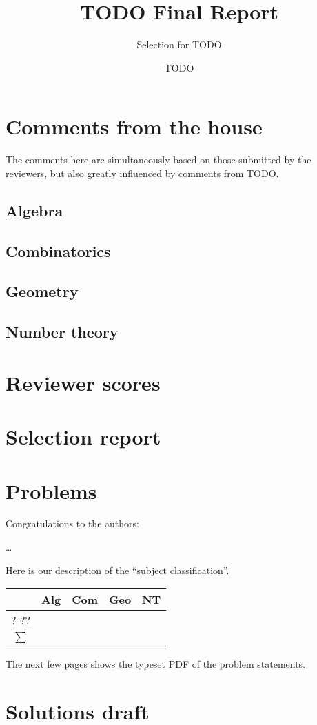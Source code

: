 \documentclass[11pt]{scrreprt}
\begin{document}
\title{TODO Final Report}
\subtitle{Selection for TODO}
\author{TODO}
\maketitle

\tableofcontents

\chapter{Comments from the house}
The comments here are simultaneously
based on those submitted by the reviewers,
but also greatly influenced by comments from TODO.

\section{Algebra}
\section{Combinatorics}
\section{Geometry}
\section{Number theory}
\chapter{Reviewer scores}
\setlength\tabcolsep{5pt}


\chapter{Selection report}
\chapter{Problems}
Congratulations to the authors:
\begin{description}
  \ii[\dots] \dots
\end{description}

Here is our description of the ``subject classification''.


\begin{center}
  \begin{tabular}[h]{c rrrr}
    \toprule
    & Alg & Com & Geo & NT \\
    \midrule
    ?-?? &      &      &      &      \\
    \midrule
    $\sum$  &      &      &      &      \\
    \bottomrule
  \end{tabular}
\end{center}

The next few pages
shows the typeset PDF of the problem statements.

% 
% 

\chapter{Solutions draft}
\end{document}
